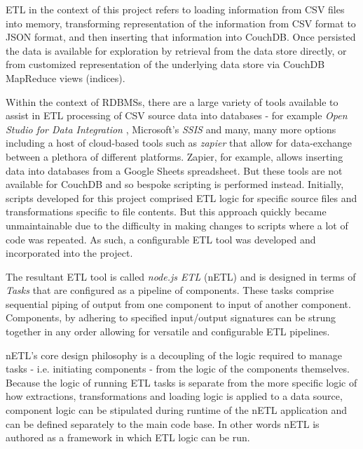 ETL in the context of this project refers to loading information from CSV files into memory, transforming representation of the information from CSV format to JSON format, and then inserting that information into CouchDB. Once persisted the data is available for exploration by retrieval from the data store directly, or from customized representation of the underlying data store via CouchDB MapReduce views (indices).

Within the context of RDBMSs, there are a large variety of tools available to assist in ETL processing of CSV source data into databases - for example \textit{Open Studio for Data Integration} \cite{talend}, Microsoft's \textit{SSIS} \cite{ssis} and many, many more options including a host of cloud-based tools such as \textit{zapier} \cite{zapier} that allow for data-exchange between a plethora of different platforms. Zapier, for example, allows inserting data into databases from a Google Sheets spreadsheet. But these tools are not available for CouchDB and so bespoke scripting is performed instead. Initially, scripts developed for this project comprised ETL logic for specific source files and transformations specific to file contents. But this approach quickly became unmaintainable due to the difficulty in making changes to scripts where a lot of code was repeated. As such, a configurable ETL tool was developed and incorporated into the project.

The resultant ETL tool is called \textit{node.js ETL} (nETL) and is designed in terms of \textit{Tasks} that are configured as a pipeline of components. These tasks comprise sequential piping of output from one component to input of another component. Components, by adhering to specified input/output signatures can be strung together in any order allowing for versatile and configurable ETL pipelines.

nETL's core design philosophy is a decoupling of the logic required to manage tasks - i.e. initiating components - from the logic of the components themselves. Because the logic of running ETL tasks is separate from the more specific logic of how extractions, transformations and loading logic is applied to a data source, component logic can be stipulated during runtime of the nETL application and can be defined separately to the main code base. In other words nETL is authored as a framework in which ETL logic can be run.